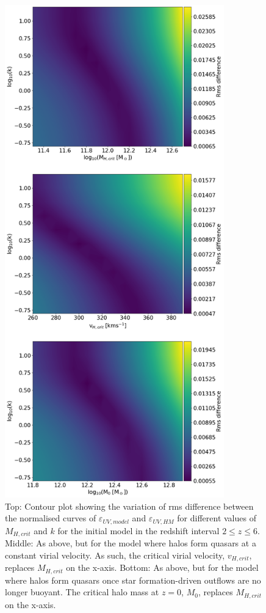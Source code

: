 \documentclass[12pt, twocolumn]{report}%
\begin{document}
\begin{figure}[H]
\centering
\includegraphics[width=9.5cm]{Contour_1.png}
\caption{Top: Contour plot showing the variation of rms difference between the normalised curves of $\varepsilon_{UV,model}$ and $\varepsilon_{UV,HM}$ for different values of $M_{H,crit}$ and $k$ for the initial model in the redshift interval $2\leq z\leq6$. Middle: As above, but for the model where halos form quasars at a constant virial velocity. As such, the critical virial velocity, $v_{H,crit}$, replaces $M_{H,crit}$ on the x-axis. Bottom: As above, but for the model where halos form quasars once star formation-driven outflows are no longer buoyant. The critical halo mass at $z=0$, $M_0$, replaces $M_{H,crit}$ on the x-axis.}
\label{fig:12}
\end{figure}
\clearpage
\twocolumngrid
\end{document}
